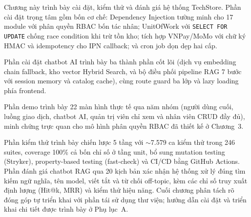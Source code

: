 Chương này trình bày cài đặt, kiểm thử và đánh giá hệ thống TechStore. Phần cài đặt trọng tâm gồm bốn cơ chế: Dependency Injection tường minh cho 17 module với phân quyền RBAC bốn tác nhân; UnitOfWork với \texttt{SELECT FOR UPDATE} chống race condition khi trừ tồn kho; tích hợp VNPay/MoMo với chữ ký HMAC và idempotency cho IPN callback; và cron job dọn dẹp hai cấp.

\begin{sloppypar}
Phần cài đặt chatbot AI trình bày ba thành phần cốt lõi (dịch vụ embedding chain fallback, kho vector Hybrid Search, và bộ điều phối pipeline RAG 7 bước với session memory và catalog cache), cùng route guard ba lớp và lazy loading phía frontend.
\end{sloppypar}

Phần demo trình bày 22 màn hình thực tế qua năm nhóm (người dùng cuối, luồng giao dịch, chatbot AI, quản trị viên chỉ xem và nhân viên CRUD đầy đủ), minh chứng trực quan cho mô hình phân quyền RBAC đã thiết kế ở Chương~3.

Phần kiểm thử trình bày chiến lược 5 tầng với $\sim$7.579 ca kiểm thử trong 246 suites, coverage 100\% cả bốn chỉ số ở tầng unit, bổ sung mutation testing (Stryker), property-based testing (fast-check) và CI\slash CD bằng GitHub Actions. Phần đánh giá chatbot RAG qua 20 kịch bản xác nhận hệ thống xử lý đúng tìm kiếm ngữ nghĩa, tên model, viết tắt và từ chối off-topic, kèm các chỉ số truy xuất định lượng (Hit@k, MRR) và kiểm thử hiệu năng. Cuối chương phân tách rõ đóng góp tự triển khai với phần tái sử dụng thư viện; hướng dẫn cài đặt và triển khai chi tiết được trình bày ở Phụ lục~A.